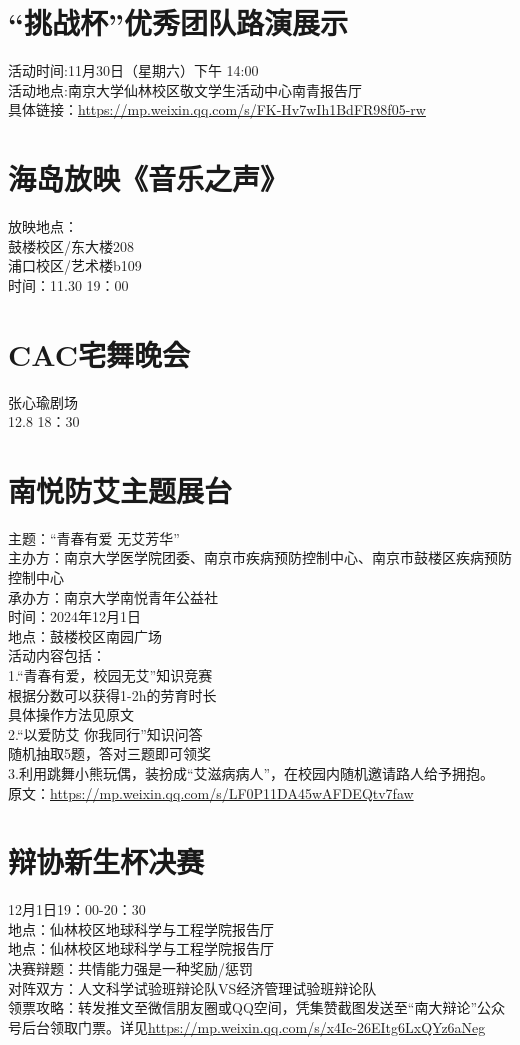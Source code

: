 \documentclass[letterpaper, 12pt]{article}
\begin{document}
\begin{multicols}{2}
\section{“挑战杯”优秀团队路演展示}
活动时间:11月30日（星期六）下午 14:00\\
活动地点:南京大学仙林校区敬文学生活动中心南青报告厅\\
具体链接：\url{https://mp.weixin.qq.com/s/FK-Hv7wIh1BdFR98f05-rw}\\

\section{海岛放映《音乐之声》}
放映地点：\\
鼓楼校区/东大楼208\\
浦口校区/艺术楼b109\\
时间：11.30 19：00

\section{CAC宅舞晚会}
张心瑜剧场\\
12.8 18：30

\section{南悦防艾主题展台}
主题：“青春有爱 无艾芳华”\\
主办方：南京大学医学院团委、南京市疾病预防控制中心、南京市鼓楼区疾病预防控制中心\\
承办方：南京大学南悦青年公益社\\
时间：2024年12月1日\\
地点：鼓楼校区南园广场\\
活动内容包括：\\
1.“青春有爱，校园无艾”知识竞赛\\
根据分数可以获得1-2h的劳育时长\\
具体操作方法见原文\\
2.“以爱防艾 你我同行”知识问答\\
随机抽取5题，答对三题即可领奖\\
3.利用跳舞小熊玩偶，装扮成“艾滋病病人”，在校园内随机邀请路人给予拥抱。
原文：\url{https://mp.weixin.qq.com/s/LF0P11DA45wAFDEQtv7faw}


\section{辩协新生杯决赛}
12月1日19：00-20：30\\
地点：仙林校区地球科学与工程学院报告厅\\地点：仙林校区地球科学与工程学院报告厅\\
决赛辩题：共情能力强是一种奖励/惩罚\\
对阵双方：人文科学试验班辩论队VS经济管理试验班辩论队\\
领票攻略：转发推文至微信朋友圈或QQ空间，凭集赞截图发送至“南大辩论”公众号后台领取门票。详见\url{https://mp.weixin.qq.com/s/x4Ic-26EItg6LxQYz6aNeg}


\end{multicols}
\end{document}
